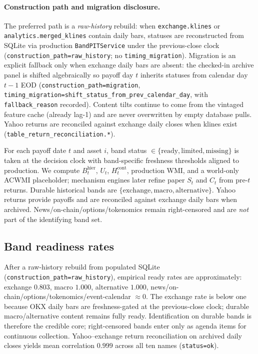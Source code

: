 \documentclass[12pt]{article}
\begin{document}
\paragraph{Construction path and migration disclosure.}
The preferred path is a \emph{raw-history} rebuild: when \texttt{exchange.klines} or \texttt{analytics.merged\_klines} contain daily bars, statuses are reconstructed from SQLite via production \texttt{BandPITService} under the previous-close clock (\texttt{construction\_path=raw\_history}; no \texttt{timing\_migration}). Migration is an explicit fallback only when exchange daily bars are absent: the checked-in archive panel is shifted algebraically so payoff day $t$ inherits statuses from calendar day $t-1$ EOD (\texttt{construction\_path=migration}, \texttt{timing\_migration=shift\_status\_from\_prev\_calendar\_day}, with \texttt{fallback\_reason} recorded). Content tilts continue to come from the vintaged feature cache (already lag-1) and are never overwritten by empty database pulls. Yahoo returns are reconciled against exchange daily closes when klines exist (\texttt{table\_return\_reconciliation.*}).

For each payoff date $t$ and asset $i$, band status $\in\{\mathrm{ready},\mathrm{limited},\mathrm{missing}\}$ is taken at the decision clock with band-specific freshness thresholds aligned to production. We compute $B^{\mathrm{hier}}_t$, $U_t$, $H^{\mathrm{cont}}_t$, production WMI, and a world-only ACWMI placeholder; mechanism engines later refine paper $S_t$ and $C_t$ from pre-$t$ returns. Durable historical bands are $\{\mathrm{exchange},\mathrm{macro},\mathrm{alternative}\}$. Yahoo returns provide payoffs and are reconciled against exchange daily bars when archived. News/on-chain/options/tokenomics remain right-censored and are \emph{not} part of the identifying band set.

\subsection{Band readiness rates}
After a raw-history rebuild from populated SQLite (\texttt{construction\_path=raw\_history}), empirical ready rates are approximately: exchange $0.803$, macro $1.000$, alternative $1.000$, news/on-chain/options/tokenomics/event-calendar $\approx 0$. The exchange rate is below one because OKX daily bars are freshness-gated at the previous-close clock; durable macro/alternative content remains fully ready. Identification on durable bands is therefore the credible core; right-censored bands enter only as agenda items for continuous collection. Yahoo--exchange return reconciliation on archived daily closes yields mean correlation $0.999$ across all ten names (\texttt{status=ok}).
\end{document}
